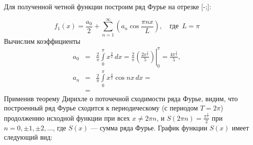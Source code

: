 \noindent
Для полученной четной функции построим ряд Фурье на отрезке [-\pi;\pi]:


$$
f_1(x)=\frac{a_0}{2}+\sum_{n=1}^\infty 
	\left(a_n\cos{\frac{\pi n x}{L}}\right),\quad\text{где }\,L=\pi
$$
\noindent
Вычислим коэффициенты
$$
\begin{array}{rcl}
a_0 &=& \displaystyle\frac{2}{\pi}\left.
\int\limits_0^\pi
x^\frac{3}{2}\,dx  = 
\frac{2}{\pi}\left(\frac{2x^\frac{5}{2}}{5}
\right)
\right|_0^\pi  = \frac{4\pi^\frac{3}{2}}{5},						\\[12pt]
a_n &=& \displaystyle\frac{2}{\pi}
	\int\limits_0^\pi
	x^\frac{3}{2}\cos {nx}\,dx   =               \\[12pt]
	&=& 
\end{array}
$$
Применив теорему Дирихле о поточечной сходимости ряда Фурье, видим, что построенный ряд Фурье сходится 
к периодическому (с периодом $T=2\pi$) продолжению исходной функции при всех $x\ne 2\pi n$, и 
$S(2\pi n)=\frac{\pi^\frac{3}{2}}{2}$ при $n=0,\pm1,\pm2,\ldots$, где $S(x)$ --- сумма ряда Фурье. 
График функции $S(x)$ имеет следующий вид:
